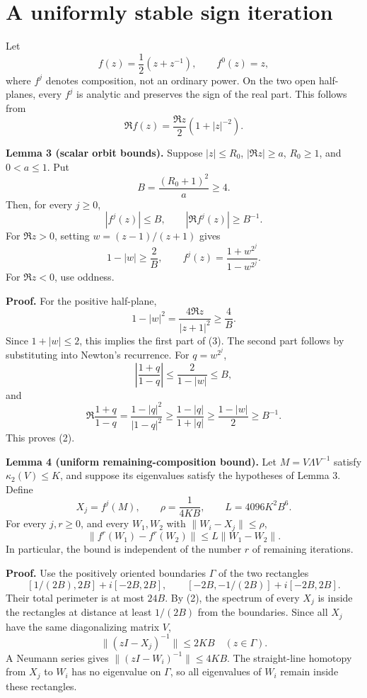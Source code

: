 \documentclass[10pt,a4paper]{article}
\begin{document}
\section{A uniformly stable sign
iteration}\label{a-uniformly-stable-sign-iteration}

Let \[
 f(z)=\frac12(z+z^{-1}),\qquad f^0(z)=z,
\] where \(f^j\) denotes composition, not an ordinary power. On the two
open half-planes, every \(f^j\) is analytic and preserves the sign of
the real part. This follows from \[
 \Re f(z)=\frac{\Re z}{2}\left(1+|z|^{-2}\right).
\]

\textbf{Lemma 3 (scalar orbit bounds).} Suppose \(|z|\le R_0\),
\(|\Re z|\ge a\), \(R_0\ge1\), and \(0<a\le1\). Put \[
 B=\frac{(R_0+1)^2}{a}\ge4.
\] Then, for every \(j\ge0\), \[
 |f^j(z)|\le B,
 \qquad |\Re f^j(z)|\ge B^{-1}.
 \tag{2}
\] For \(\Re z>0\), setting \(w=(z-1)/(z+1)\) gives \[
 1-|w|\ge\frac2B,
 \qquad
 f^j(z)=\frac{1+w^{2^j}}{1-w^{2^j}}.
 \tag{3}
\] For \(\Re z<0\), use oddness.

\textbf{Proof.} For the positive half-plane, \[
 1-|w|^2=\frac{4\Re z}{|z+1|^2}\ge\frac4B.
\] Since \(1+|w|\le2\), this implies the first part of (3). The second
part follows by substituting into Newton's recurrence. For
\(q=w^{2^j}\), \[
 \left|\frac{1+q}{1-q}\right|\le\frac2{1-|w|}\le B,
\] and \[
 \Re\frac{1+q}{1-q}
 =\frac{1-|q|^2}{|1-q|^2}
 \ge\frac{1-|q|}{1+|q|}
 \ge\frac{1-|w|}{2}\ge B^{-1}.
\] This proves (2).

\textbf{Lemma 4 (uniform remaining-composition bound).} Let
\(M=V\Lambda V^{-1}\) satisfy \(\kappa_2(V)\le K\), and suppose its
eigenvalues satisfy the hypotheses of Lemma 3. Define \[
 X_j=f^j(M),\qquad
 \rho=\frac1{4KB},\qquad
 L=4096K^2B^6.
 \tag{4}
\] For every \(j,r\ge0\), and every \(W_1,W_2\) with
\(\|W_i-X_j\|\le\rho\), \[
 \|f^r(W_1)-f^r(W_2)\|\le L\|W_1-W_2\|.
 \tag{5}
\] In particular, the bound is independent of the number \(r\) of
remaining iterations.

\textbf{Proof.} Use the positively oriented boundaries \(\Gamma\) of the
two rectangles \[
 [1/(2B),2B]+i[-2B,2B],
 \qquad [-2B,-1/(2B)]+i[-2B,2B].
\] Their total perimeter is at most \(24B\). By (2), the spectrum of
every \(X_j\) is inside the rectangles at distance at least \(1/(2B)\)
from the boundaries. Since all \(X_j\) have the same diagonalizing
matrix \(V\), \[
 \|(zI-X_j)^{-1}\|\le2KB\quad(z\in\Gamma).
\] A Neumann series gives \(\|(zI-W_i)^{-1}\|\le4KB\). The straight-line
homotopy from \(X_j\) to \(W_i\) has no eigenvalue on \(\Gamma\), so all
eigenvalues of \(W_i\) remain inside these rectangles.
\end{document}
